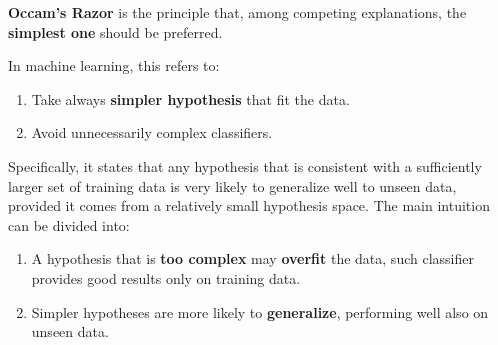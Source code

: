 \textbf{Occam's Razor} is the principle that, among competing explanations, the \textbf{simplest one} should be preferred. \vspace{7pt}

In machine learning, this refers to:
\begin{enumerate}
    \item Take always \textbf{simpler hypothesis} that fit the data.
    \item Avoid unnecessarily complex classifiers.
\end{enumerate}
Specifically, it states that any hypothesis that is consistent with a sufficiently larger set of training data is very likely to generalize well to unseen data, 
provided it comes from a relatively small hypothesis space. The main intuition can be divided into:
\begin{enumerate}
    \item A hypothesis that is \textbf{too complex} may \textbf{overfit} the data, such classifier provides good results only on training data.
    \item Simpler hypotheses are more likely to \textbf{generalize}, performing well also on unseen data.
\end{enumerate}
